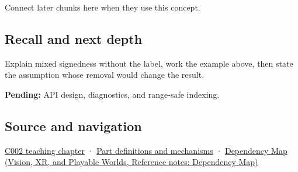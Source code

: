 \hypertarget{appendix-736a2345de4a-used-by}{}

Connect later chunks here when they use this concept.

\subsection{Recall and next depth}\label{appendix-736a2345de4a-recall-and-next-depth}

\hypertarget{appendix-736a2345de4a-recall-and-next-depth}{}

Explain mixed signedness without the label, work the example above, then state the assumption whose removal would change the result.

\textbf{Pending:} API design, diagnostics, and range-safe indexing.

\subsection{Source and navigation}\label{appendix-736a2345de4a-source-and-navigation}

\hypertarget{appendix-736a2345de4a-source-and-navigation}{}

\hyperref[01-foundations-i-ch001-arithmetic-becomes-a-policy]{C002 teaching chapter} · \hyperref[appendix-fd090d982a15]{Part definitions and mechanisms} · \href{../07-Vision-XR-and-Playable-Worlds/main.pdf\#nameddest=appendix-4ad47bdd269a}{Dependency Map (Vision, XR, and Playable Worlds, Reference notes: Dependency Map)}
